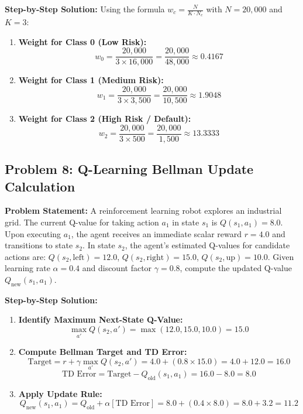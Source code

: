 \textbf{Step-by-Step Solution:}
Using the formula $w_c = \frac{N}{K \cdot N_c}$ with $N = 20,000$ and $K = 3$:
\begin{enumerate}[label=\arabic*.]
    \item \textbf{Weight for Class 0 (Low Risk):}
    \[
    w_0 = \frac{20,000}{3 \times 16,000} = \frac{20,000}{48,000} \approx \mathbf{0.4167}
    \]
    \item \textbf{Weight for Class 1 (Medium Risk):}
    \[
    w_1 = \frac{20,000}{3 \times 3,500} = \frac{20,000}{10,500} \approx \mathbf{1.9048}
    \]
    \item \textbf{Weight for Class 2 (High Risk / Default):}
    \[
    w_2 = \frac{20,000}{3 \times 500} = \frac{20,000}{1,500} \approx \mathbf{13.3333}
    \]
\end{enumerate}

\subsection*{Problem 8: Q-Learning Bellman Update Calculation}
\textbf{Problem Statement:} A reinforcement learning robot explores an industrial grid. The current Q-value for taking action $a_1$ in state $s_1$ is $Q(s_1, a_1) = 8.0$.
Upon executing $a_1$, the agent receives an immediate scalar reward $r = 4.0$ and transitions to state $s_2$. In state $s_2$, the agent's estimated Q-values for candidate actions are:
$Q(s_2, \text{left}) = 12.0$, $Q(s_2, \text{right}) = 15.0$, $Q(s_2, \text{up}) = 10.0$.
Given learning rate $\alpha = 0.4$ and discount factor $\gamma = 0.8$, compute the updated Q-value $Q_{\text{new}}(s_1, a_1)$.

\textbf{Step-by-Step Solution:}
\begin{enumerate}[label=\arabic*.]
    \item \textbf{Identify Maximum Next-State Q-Value:}
    \[
    \max_{a'} Q(s_2, a') = \max(12.0, 15.0, 10.0) = 15.0
    \]
    \item \textbf{Compute Bellman Target and TD Error:}
    \[
    \text{Target} = r + \gamma \max_{a'} Q(s_2, a') = 4.0 + (0.8 \times 15.0) = 4.0 + 12.0 = 16.0
    \]
    \[
    \text{TD Error} = \text{Target} - Q_{\text{old}}(s_1, a_1) = 16.0 - 8.0 = 8.0
    \]
    \item \textbf{Apply Update Rule:}
    \[
    Q_{\text{new}}(s_1, a_1) = Q_{\text{old}} + \alpha [\text{TD Error}] = 8.0 + (0.4 \times 8.0) = 8.0 + 3.2 = \mathbf{11.2}
    \]
\end{enumerate}

